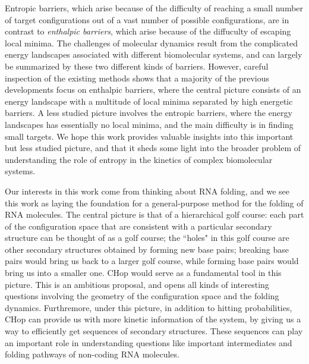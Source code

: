 \documentclass[english, aip, jcp, priprint, graphicx,floatfix]{revtex4-1}
\theoremstyle{plain}
\theoremstyle{definition}
\theoremstyle{plain}
\begin{document}
Entropic barriers, which arise because of the difficulty of reaching a small number of target configurations out of a vast number of possible configurations, are in contrast to \emph{enthalpic barriers}, which arise because of the diffuculty of escaping local minima. The challenges of molecular dynamics result from the complicated energy landscapes associated with different biomolecular systems, and can largely be summarized by these two different kinds of barriers. However, careful inspection of the existing methods shows that a majority of the previous developments focus on enthalpic barriers, where the central picture consists of an energy landscape with a multitude of local minima separated by high energetic barriers. A less studied picture involves the entropic barriers, where the energy landscapes has essentially no local minima, and the main difficulty is in finding small targets. We hope this work provides valuable insights into this important but less studied picture, and that it sheds some light into the broader problem of understanding the role of entropy in the kinetics of complex biomolecular systems. 

Our interests in this work come from thinking about RNA folding, and we see this work as laying the foundation for a general-purpose method for the folding of RNA molecules. The central picture is that of a hierarchical golf course: each part of the configuration space that are consistent with a particular secondary structure can be thought of as a golf course; the ``holes" in this golf course are other secondary structures obtained by forming new base pairs; breaking base pairs would bring us back to a larger golf course, while forming base pairs would bring us into a smaller one. CHop would serve as a fundamental tool in this picture. This is an ambitious proposal, and opens all kinds of interesting questions involving the geometry of the configuration space and the folding dynamics. Furthremore, under this picture, in addition to hitting probabilities, CHop can provide us with more kinetic information of the system, by giving us a way to efficiently get sequences of secondary structures. These sequences can play an important role in understanding questions like important intermediates and folding pathways of non-coding RNA molecules.

\newpage

\appendix

                                                         
\end{document}
